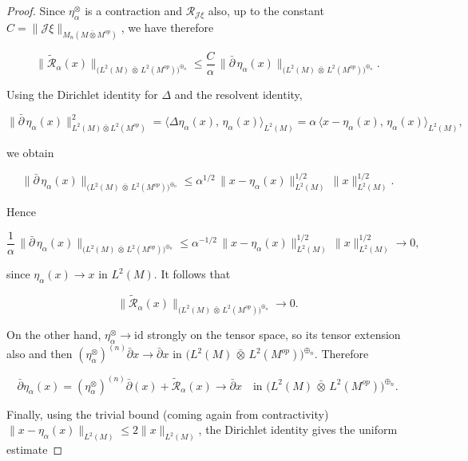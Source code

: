 \documentclass[10pt,a4paper,reqno]{amsart}
\begin{document}
\begin{proof}
\bigskip
Since $\eta_\alpha^{\otimes}$ is a contraction and $\mathcal R_{\mathscr J\xi}$ also, up to the
constant $C=\|\mathscr{J}\xi\|_{M_n(M\bar\otimes M^{op})}$, we have therefore


\[
\|\tilde{\mathcal R}_\alpha(x)\|_{\big(L^2(M)\,\bar\otimes\,L^2(M^{op})\big)^{\oplus_n}}
\le
\frac{C}{\alpha}\,\|\bar\partial\,\eta_\alpha(x)\|_{\big(L^2(M)\,\bar\otimes\,L^2(M^{op})\big)^{\oplus_n}}.
\]



Using the Dirichlet identity for $\Delta$ and the resolvent identity,


\[
\|\bar\partial\,\eta_\alpha(x)\|_{L^2(M)\bar\otimes L^2(M^{op})}^2
=
\langle \Delta\eta_\alpha(x),\,\eta_\alpha(x)\rangle_{L^2(M)}
=
\alpha\,\langle x-\eta_\alpha(x),\,\eta_\alpha(x)\rangle_{L^2(M)},
\]


we obtain


\[
\|\bar\partial\,\eta_\alpha(x)\|_{\big(L^2(M)\,\bar\otimes\,L^2(M^{op})\big)^{\oplus_n}}
\le
\alpha^{1/2}\,\|x-\eta_\alpha(x)\|_{L^2(M)}^{1/2}\,\|x\|_{L^2(M)}^{1/2}.
\]



Hence


\[
\frac{1}{\alpha}\,\|\bar\partial\,\eta_\alpha(x)\|_{\big(L^2(M)\,\bar\otimes\,L^2(M^{op})\big)^{\oplus_n}}
\le
\alpha^{-1/2}\,\|x-\eta_\alpha(x)\|_{L^2(M)}^{1/2}\,\|x\|_{L^2(M)}^{1/2}
\longrightarrow 0,
\]


since $\eta_\alpha(x)\to x$ in $L^2(M)$. It follows that


\[
\|\tilde{\mathcal R}_\alpha(x)\|_{\big(L^2(M)\,\bar\otimes\,L^2(M^{op})\big)^{\oplus_n}}
\longrightarrow 0.
\]



On the other hand, $\eta_\alpha^{\otimes}\to\mathrm{id}$ strongly on the tensor space, so its tensor extension also and then $(\eta_\alpha^{\otimes})^{(n)}\bar\partial x\to\bar\partial x$ in
$\big(L^2(M)\,\bar\otimes\,L^2(M^{op})\big)^{\oplus_n}$. Therefore


\[
\bar\partial \eta_{\alpha}(x)
=
(\eta_\alpha^{\otimes})^{(n)}\bar\partial (x) + \tilde{\mathcal R}_\alpha(x)
\longrightarrow
\bar\partial x
\quad\text{in }\big(L^2(M)\,\bar\otimes\,L^2(M^{op})\big)^{\oplus_n}.
\]



\bigskip

Finally, using the trivial bound (coming again from contractivity) $\|x-\eta_\alpha(x)\|_{L^2(M)}\le 2\|x\|_{L^2(M)}$, the Dirichlet identity gives the uniform estimate




\end{proof}
\end{document}
